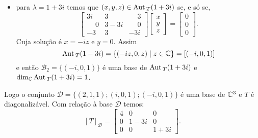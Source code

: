 \begin{exemplo}
\begin{enumerate}[label={\arabic*})]
\begin{solucao}
\begin{itemize}
                \item para $\lambda = 1 + 3i$ temos que $(x,y,z) \in {\rm Aut\,}_T(1 + 3i)$ se, e s\'o se,
                \[
                    \begin{bmatrix}
                        3i & 3 & \phantom{-}3\\
                        \phantom{-}0 & 3 - 3i & \phantom{-}0\\
                        -3 & 3 & -3i
                    \end{bmatrix}\begin{bmatrix}
                        x\\y\\z
                    \end{bmatrix} = \begin{bmatrix}
                        0\\0\\0
                    \end{bmatrix}.
                \]
                Cuja solu\c{c}ão é $x = -iz$ e $y = 0$. Assim
                \[
                    {\rm Aut\,}_T(1 - 3i) = \{(-iz,0,z) \mid z \in \mathbb{C}\} = [(-i,0,1)]
                \]
                e ent\~ao $\mathcal{B}_2 = \{(-i,0,1)\}$ \'e uma base de ${\rm Aut\,}_T(1 + 3i)$ e $\dim_{\mathbb{C}}{\rm Aut\,}_T(1 + 3i) = 1$.
            \end{itemize}

            Logo o conjunto $\mathcal{D} = \{(2, 1, 1); (i, 0, 1); (-i, 0, 1)\}$ é uma base de $\mathbb{C}^3$ e $T$ é diagonalizável. Com rela\c{c}ão à base $\mathcal{D}$ temos:
            \[
                [T]_\mathcal{D} = \begin{bmatrix}4 & 0 & 0\\0 & 1 - 3i & 0\\0 & 0 & 1 + 3i\end{bmatrix}.
            \]
            \end{solucao}


\end{enumerate}
\end{exemplo}
